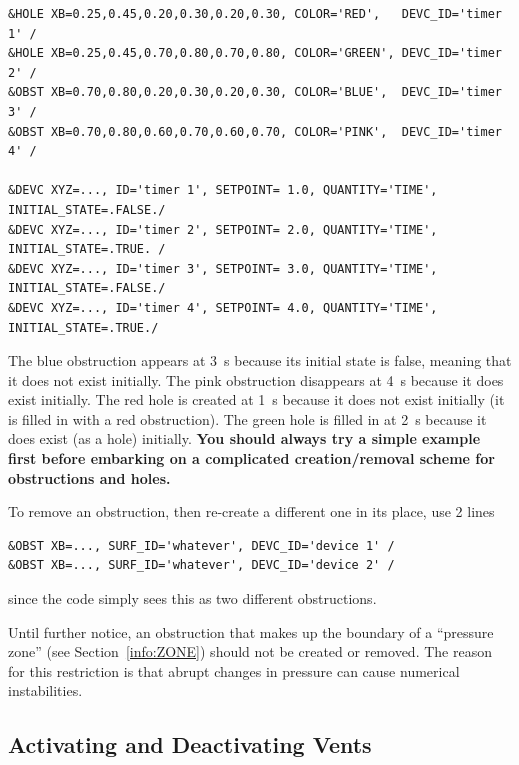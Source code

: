 \documentclass[11pt]{book}
\begin{document}
\footnotesize
\begin{verbatim}
&HOLE XB=0.25,0.45,0.20,0.30,0.20,0.30, COLOR='RED',   DEVC_ID='timer 1' /
&HOLE XB=0.25,0.45,0.70,0.80,0.70,0.80, COLOR='GREEN', DEVC_ID='timer 2' /
&OBST XB=0.70,0.80,0.20,0.30,0.20,0.30, COLOR='BLUE',  DEVC_ID='timer 3' /
&OBST XB=0.70,0.80,0.60,0.70,0.60,0.70, COLOR='PINK',  DEVC_ID='timer 4' /

&DEVC XYZ=..., ID='timer 1', SETPOINT= 1.0, QUANTITY='TIME', INITIAL_STATE=.FALSE./
&DEVC XYZ=..., ID='timer 2', SETPOINT= 2.0, QUANTITY='TIME', INITIAL_STATE=.TRUE. /
&DEVC XYZ=..., ID='timer 3', SETPOINT= 3.0, QUANTITY='TIME', INITIAL_STATE=.FALSE./
&DEVC XYZ=..., ID='timer 4', SETPOINT= 4.0, QUANTITY='TIME', INITIAL_STATE=.TRUE./
\end{verbatim}
\normalsize

\noindent
The blue obstruction appears at 3~s because its initial state is false, meaning that it does not exist initially. The pink
obstruction disappears at 4~s because it does exist initially. The red hole is created at 1~s because it does not exist initially (it is filled in with a
red obstruction). The green hole is filled in at 2~s because it does exist (as a hole) initially. {\bf You should always try a simple example first before
embarking on a complicated creation/removal scheme for obstructions and holes.}


To remove an obstruction, then re-create a different one in its place, use 2 lines

\footnotesize
\begin{verbatim}
&OBST XB=..., SURF_ID='whatever', DEVC_ID='device 1' /
&OBST XB=..., SURF_ID='whatever', DEVC_ID='device 2' /
\end{verbatim}

\normalsize
\noindent
since the code simply sees this as two different obstructions.

\begin{warning}
Until further notice, an obstruction that makes up the boundary of a ``pressure zone'' (see Section~\ref{info:ZONE}) should not be created or
removed. The reason for this restriction is that abrupt changes in pressure can cause numerical instabilities.
\end{warning}


\subsection{Activating and Deactivating Vents}
\label{info:activate_deactivate}
\end{document}
